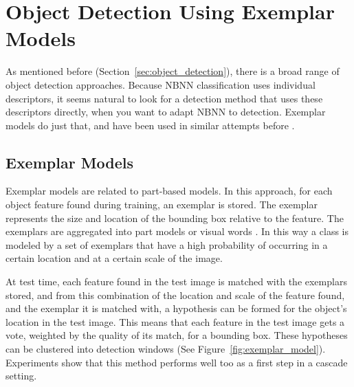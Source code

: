 \section{Object Detection Using Exemplar Models} %
\label{cha:object_detection}

As mentioned before (Section~\ref{sec:object_detection}), there is a broad range of object detection approaches. Because NBNN classification uses individual descriptors, it seems natural to look for a detection method that uses these descriptors directly, when you want to adapt NBNN to detection. Exemplar models do just that, and have been used in similar attempts before \cite{becker2012codebook}.

\subsection{Exemplar Models} %
\label{sub:exemplar_models}

Exemplar models are related to part-based models.\cite{leibe2004combined, chum2007exemplar} In this approach, for each object feature found during training, an exemplar is stored. The exemplar represents the size and location of the bounding box relative to the feature. The exemplars are aggregated into part models \cite{leibe2004combined} or visual words \cite{chum2007exemplar}. In this way a class is modeled by a set of exemplars that have a high probability of occurring in a certain location and at a certain scale of the image.

At test time, each feature found in the test image is matched with the exemplars stored, and from this combination of the location and scale of the feature found, and the exemplar it is matched with, a hypothesis can be formed for the object's location in the test image. This means that each feature in the test image gets a vote, weighted by the quality of its match, for a bounding box. These hypotheses can be clustered into detection windows (See Figure~\ref{fig:exemplar_model}). Experiments \cite{vedaldi2009multiple} show that this method performs well too as a first step in a cascade setting.

